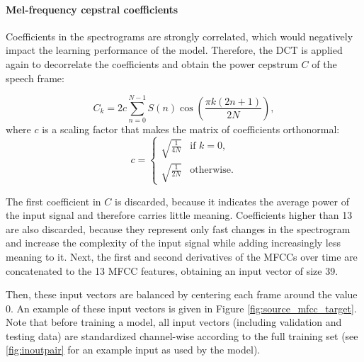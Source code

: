 		\paragraph{Mel-frequency cepstral coefficients}

			Coefficients in the spectrograms are strongly correlated, which would negatively impact the learning performance of the model.
			Therefore, the DCT is applied again to decorrelate the coefficients and obtain the power cepstrum $C$ of the speech frame:

			\begin{equation}
				C_k = 2c\sum^{N-1}_{n=0}S\left(n\right)\cos\left(\frac{\pi k\left(2n+1\right)}{2N}\right),
			\end{equation}
			where $c$ is a scaling factor that makes the matrix of coefficients orthonormal:
			\begin{equation}
			c = \begin{cases}
				\sqrt{\frac{1}{4N}} & \mbox{if } k = 0,\\
				\sqrt{\frac{1}{2N}} & \mbox{otherwise.}
			\end{cases}
			\end{equation}

			The first coefficient in $C$ is discarded, because it indicates the average power of the input signal and therefore carries little meaning.
			Coefficients higher than 13 are also discarded, because they represent only fast changes in the spectrogram and increase the complexity of the input signal while adding increasingly less meaning to it.
			Next, the first and second derivatives of the MFCCs over time are concatenated to the 13 MFCC features, obtaining an input vector of size 39.

			Then, these input vectors are balanced by centering each frame around the value 0.
			An example of these input vectors is given in Figure \ref{fig:source_mfcc_target}.
			Note that before training a model, all input vectors (including validation and testing data) are standardized channel-wise according to the full training set (see \ref{fig:inoutpair} for an example input as used by the model).

